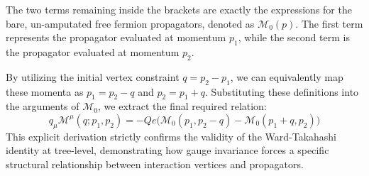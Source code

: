 The two terms remaining inside the brackets are exactly the expressions for the bare, un-amputated free fermion propagators, denoted as $\mathcal{M}_0(p)$. The first term represents the propagator evaluated at momentum $p_1$, while the second term is the propagator evaluated at momentum $p_2$.

By utilizing the initial vertex constraint $q = p_2 - p_1$, we can equivalently map these momenta as $p_1 = p_2 - q$ and $p_2 = p_1 + q$. Substituting these definitions into the arguments of $\mathcal{M}_0$, we extract the final required relation:
\[
    q_\mu \mathcal{M}^\mu(q; p_1, p_2) = -Qe \Big( \mathcal{M}_0(p_1, p_2 - q) - \mathcal{M}_0(p_1 + q, p_2) \Big)
\]
This explicit derivation strictly confirms the validity of the Ward-Takahashi identity at tree-level, demonstrating how gauge invariance forces a specific structural relationship between interaction vertices and propagators.
